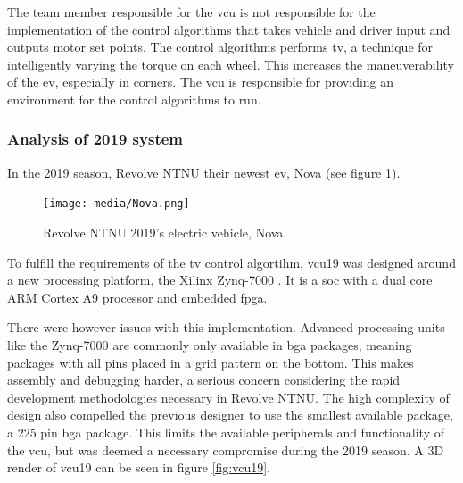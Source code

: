 The team member responsible for the \acrshort{vcu} is not responsible for the implementation of the control algorithms that takes vehicle and driver input and outputs motor set points. The control algorithms performs \acrfull{tv}, a technique for intelligently varying the torque on each wheel. This increases the maneuverability of the \acrshort{ev}, especially in corners. The \acrshort{vcu} is responsible for providing an environment for the control algorithms to run.



\subsubsection{Analysis of 2019 system}\label{sec:2019sys}

In the 2019 season, Revolve NTNU their newest \acrshort{ev}, Nova (see figure \ref{fig:nova}).

\begin{figure}[H]
    \centering
    \texttt{[image: media/Nova.png]}
    \caption{Revolve NTNU 2019's electric vehicle, Nova.}
    \label{fig:nova}
\end{figure}

To fulfill the requirements of the \acrshort{tv} control algortihm, \acrfull{vcu19} was designed around a new processing platform, the Xilinx Zynq-7000 \cite{zynq}. It is a \acrfull{soc} with a dual core ARM Cortex A9 processor and embedded \acrfull{fpga}. 

There were however issues with this implementation. Advanced processing units like the Zynq-7000 are commonly only available in \acrfull{bga} packages, meaning packages with all pins placed in a grid pattern on the bottom. This makes assembly and debugging harder, a serious concern considering the rapid development methodologies necessary in Revolve NTNU. The high complexity of design also compelled the previous designer to use the smallest available package, a 225 pin \acrshort{bga} package. This limits the available peripherals and functionality of the \acrshort{vcu}, but was deemed a necessary compromise during the 2019 season. A 3D render of \acrshort{vcu19} can be seen in figure \ref{fig:vcu19}.

